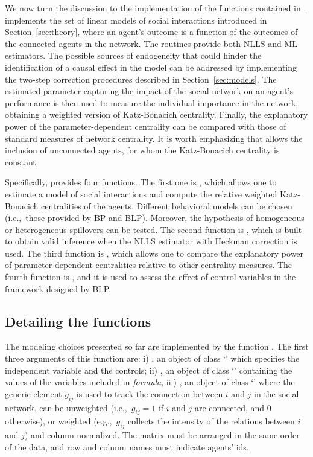 \documentclass[nojss]{jss}
\begin{document}
We now turn the discussion to the implementation of the functions contained
in .   implements the set of linear models of social
interactions introduced in Section~\ref{sec:theory}, where an agent's outcome is a function
of the outcomes of the connected agents in the network.  The routines
provide both NLLS and ML estimators.  The possible sources of endogeneity
that could hinder the identification of a causal effect in the model can be
addressed by implementing the two-step correction procedures described in
Section~\ref{sec:models}.  The estimated parameter capturing the impact of the social
network on an agent's performance is then used to measure the individual
importance in the network, obtaining a weighted version of Katz-Bonacich
centrality.  Finally, the explanatory power of the parameter-dependent
centrality can be compared with those of standard measures of network
centrality.  It is worth emphasizing that  allows the inclusion
of unconnected agents, for whom the Katz-Bonacich centrality is constant.

Specifically,  provides four functions.  The first one is
, which allows one to estimate a model of social interactions
and compute the relative weighted Katz-Bonacich centralities of the agents. 
Different behavioral models can be chosen (i.e.,~those provided by BP and
BLP).  Moreover, the hypothesis of homogeneous or heterogeneous spillovers can
be tested.  The second function is , which is built to obtain
valid inference when the NLLS estimator with Heckman correction is used. 
The third function is , which allows one to compare the
explanatory power of parameter-dependent centralities relative to other
centrality measures.  The fourth function is , and it is used
to assess the effect of control variables in the framework designed by BLP.

\subsection{Detailing the functions}

The modeling choices presented so far are implemented by the function
. The first three arguments of this function are: i) , an object
of class `' which specifies the independent variable and the
controls; ii) , an object of class `' containing
the values of the variables included in \emph{formula}, iii) , an
object of class `' where the generic element $g_{ij}$ is used to
track the connection between $i$ and $j$ in the social network.  
can be unweighted (i.e.,~$g_{ij}=1$ if $i$ and $j$ are connected, and 0
otherwise), or weighted (e.g.,~$g_{ij}$ collects the intensity of the
relations between $i$ and $j$) and column-normalized.  The matrix must be
arranged in the same order of the data, and row and column names must
indicate agents' ids.
\end{document}
